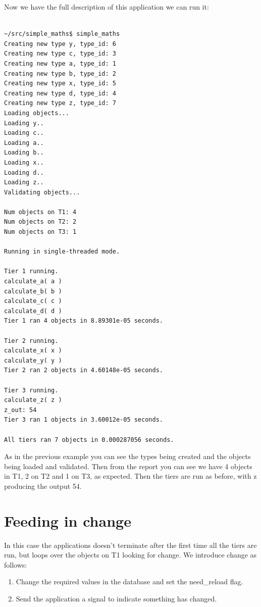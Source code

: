 \documentclass{report}
\begin{document}
Now we have the full description of this application we can run it:

\begin{verbatim}

~/src/simple_maths$ simple_maths
Creating new type y, type_id: 6
Creating new type c, type_id: 3
Creating new type a, type_id: 1
Creating new type b, type_id: 2
Creating new type x, type_id: 5
Creating new type d, type_id: 4
Creating new type z, type_id: 7
Loading objects...
Loading y..
Loading c..
Loading a..
Loading b..
Loading x..
Loading d..
Loading z..
Validating objects...

Num objects on T1: 4
Num objects on T2: 2
Num objects on T3: 1

Running in single-threaded mode.

Tier 1 running.
calculate_a( a )
calculate_b( b )
calculate_c( c )
calculate_d( d )
Tier 1 ran 4 objects in 8.89301e-05 seconds.

Tier 2 running.
calculate_x( x )
calculate_y( y )
Tier 2 ran 2 objects in 4.60148e-05 seconds.

Tier 3 running.
calculate_z( z )
z_out: 54
Tier 3 ran 1 objects in 3.60012e-05 seconds.

All tiers ran 7 objects in 0.000287056 seconds.

\end{verbatim}

As in the previous example you can see the types being created and the objects being loaded and validated. Then from the report you can see we have 4 objects in T1, 2 on T2 and 1 on T3, as expected. Then the tiers are run as before, with z producing the output 54.

\section{Feeding in change}

In this case the applications doesn't terminate after the first time all the tiers are run, but loops over the objects on T1 looking for change. We introduce change as follows:

\begin{enumerate}

\item Change the required values in the database and set the need_reload flag.
\item Send the application a signal to indicate something has changed.

\end{enumerate}
\end{document}
